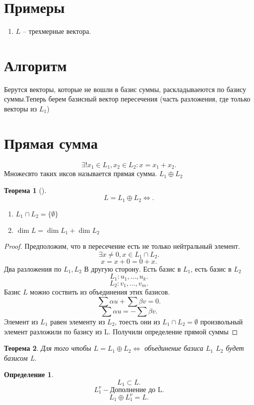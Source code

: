 \documentclass{scrartcl}
\newtheorem{theorem}{Теорема}
\newtheorem{definition}{Определение}
\begin{document}
\section{Примеры}
\begin{enumerate}
    \item $L$ -- трехмерные вектора.
\end{enumerate}
\section{Алгоритм}
Берутся векторы, которые не вошли в базис суммы, раскладываеются по базису суммы.Теперь берем базисный вектор пересечения (часть разложения, где только векторы из $L_1$)
\section{Прямая сумма}
\[
\exists  ! x_1 \in L_1 , x_2 \in L_2 : x = x_1 + x_2
.\] 
Множесвто таких иксов называется прямая сумма. $L_1 \oplus L_2$
\begin{theorem}[]
    \[
    L = L_1 \oplus L_2 \iff
    .\] 
    \begin{enumerate}
        \item $L_1 \cap L_2 = \{ \emptyset \}$ 
        \item $\dim{L} = \dim{L_1} + \dim{L_2}$
    \end{enumerate}
\end{theorem}
\begin{proof}
    Предположим, что в пересечение есть не только нейтральный элемент.
    \[
    \exists x \neq 0 , x \in L_1 \cap L_2
    .\] 
    \[
    x = x + 0 = 0 + x
    .\] 
    Два разложения по $L_1,L_2$
    В другую сторону. Есть базис в $L_1$, есть базис в  $L_2$ 
    \[
    L_1 : u_1,\dots,u_{k}
    .\] 
    \[
    L_2 : v_1,\dots,v_{m}
    .\] 
    Базис $L$ можно соствить из объединения этих базисов.
     \[
    \sum \alpha u + \sum \beta v = 0
    .\] 
    \[
    \sum \alpha u = - \sum \beta v
    .\] 
    Элемент из $L_1$ равен элементу из $L_2$, тоесть они из $L_1 \cap L_2 = \emptyset$
    произвольный элемент разложили по базису из L. Получили определение прямой суммы
\end{proof}
\begin{theorem}
    Для того чтобы $L = L_1 \oplus L_2 \iff $ объединение базиса $L_1$ $L_2$ будет базисом L.
\end{theorem}
\begin{definition}
    \[
    L_1 \subset L
    .\] 
    \[
        L^{\nu}_{1} - \text{Дополнение до L}
    .\] 
    \[
    L_1 \oplus L_1^{\nu} = L
    .\] 
\end{definition}
\end{document}
